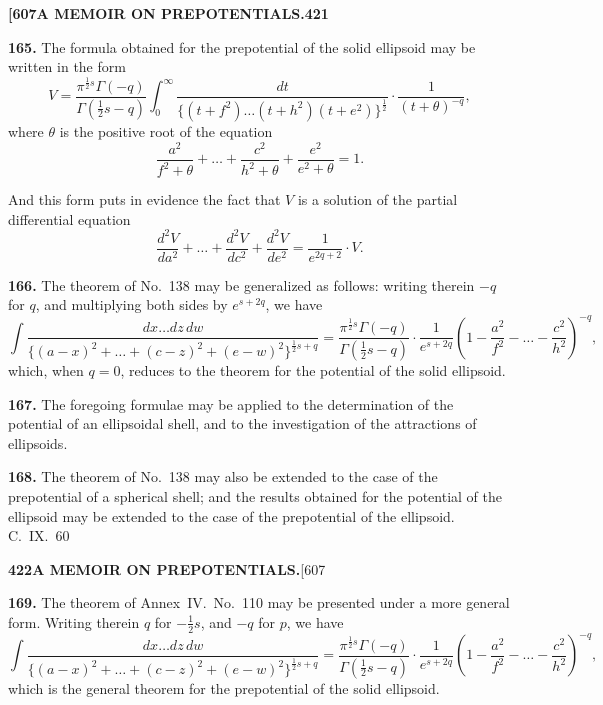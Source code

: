 \documentclass[11pt,a4paper]{article}
\begin{document}
{\newpage
\noindent\textbf{[607}\hspace{\fill}\textbf{A MEMOIR ON PREPOTENTIALS.}\hspace{\fill}\textbf{421}

\noindent\textbf{165.}
The formula obtained for the prepotential of the solid ellipsoid may be written in the form
\[
V = \frac{\pi^{\frac{1}{2}s}\Gamma(-q)}{\Gamma(\frac{1}{2}s-q)} \int_0^\infty \frac{dt}{\{(t+f^2)\ldots(t+h^2)(t+e^2)\}^{\frac{1}{2}}} \cdot \frac{1}{(t + \theta)^{-q}},
\]
where $\theta$ is the positive root of the equation
\[
\frac{a^2}{f^2+\theta} + \ldots + \frac{c^2}{h^2+\theta} + \frac{e^2}{e^2+\theta} = 1.
\]

And this form puts in evidence the fact that $V$ is a solution of the partial differential equation
\[
\frac{d^2V}{da^2} + \ldots + \frac{d^2V}{dc^2} + \frac{d^2V}{de^2} = \frac{1}{e^{2q+2}} \cdot V.
\]

\medskip
\noindent\textbf{166.}
The theorem of No.~138 may be generalized as follows: writing therein $-q$ for $q$, and multiplying both sides by $e^{s+2q}$, we have
\[
\int \frac{dx\ldots dz\, dw}{\{(a-x)^2 + \ldots + (c-z)^2 + (e-w)^2\}^{\frac{1}{2}s+q}} = \frac{\pi^{\frac{1}{2}s}\Gamma(-q)}{\Gamma(\frac{1}{2}s-q)} \cdot \frac{1}{e^{s+2q}} \left(1 - \frac{a^2}{f^2} - \ldots - \frac{c^2}{h^2}\right)^{-q},
\]
which, when $q = 0$, reduces to the theorem for the potential of the solid ellipsoid.

\medskip
\noindent\textbf{167.}
The foregoing formulae may be applied to the determination of the potential of an ellipsoidal shell, and to the investigation of the attractions of ellipsoids.

\medskip
\noindent\textbf{168.}
The theorem of No.~138 may also be extended to the case of the prepotential of a spherical shell; and the results obtained for the potential of the ellipsoid may be extended to the case of the prepotential of the ellipsoid.
\hfill C.~IX.\ 60

\newpage
\noindent\textbf{422}\hspace{\fill}\textbf{A MEMOIR ON PREPOTENTIALS.}\hspace{\fill}[607

\noindent\textbf{169.}
The theorem of Annex~IV.\ No.~110 may be presented under a more general form. Writing therein $q$ for $-\frac{1}{2}s$, and $-q$ for $p$, we have
\[
\int \frac{dx\ldots dz\, dw}{\{(a-x)^2 + \ldots + (c-z)^2 + (e-w)^2\}^{\frac{1}{2}s+q}} = \frac{\pi^{\frac{1}{2}s}\Gamma(-q)}{\Gamma(\frac{1}{2}s-q)} \cdot \frac{1}{e^{s+2q}} \left(1 - \frac{a^2}{f^2} - \ldots - \frac{c^2}{h^2}\right)^{-q},
\]
which is the general theorem for the prepotential of the solid ellipsoid.

}
\end{document}
